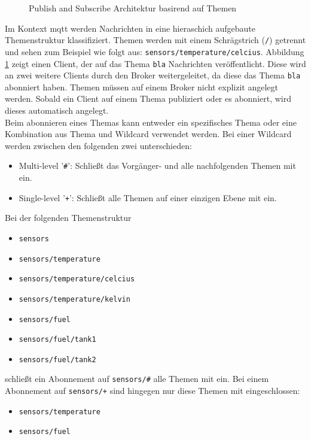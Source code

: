 \begin{figure}
    \centering
    \caption{Publish and Subscribe Architektur basirend auf Themen}
    \label{fig:publish-subscribe}
\end{figure}
Im Kontext \ac{mqtt} werden Nachrichten in eine hieraschich aufgebaute Themenstruktur klassifiziert. Themen werden mit einem Schrägstrich (\verb|/|) getrennt und sehen zum Beispiel wie folgt aus: \verb|sensors/temperature/celcius|. Abbildung \ref{fig:publish-subscribe} zeigt einen Client, der auf das Thema \verb|bla| Nachrichten veröffentlicht. Diese wird an zwei weitere Clients durch den Broker weitergeleitet, da diese das Thema \verb|bla| abonniert haben. Themen müssen auf einem Broker nicht explizit angelegt werden. Sobald ein Client auf einem Thema publiziert oder es abonniert, wird dieses automatisch angelegt.\cite{WhatMQTTDefinition}\\
Beim abonnieren eines Themas kann entweder ein spezifisches Thema oder eine Kombination aus Thema und Wildcard verwendet werden. Bei einer Wildcard werden zwischen den folgenden zwei unterschieden:\cite{mqtt5Specification}
\begin{itemize}
    \item Multi-level '\verb|#|': Schlie{\ss}t das Vorgänger- und alle nachfolgenden Themen mit ein.
    \item Single-level '\verb|+|': Schlie{\ss}t alle Themen auf einer einzigen Ebene mit ein.
\end{itemize}
Bei der folgenden Themenstruktur
\begin{itemize}
    \item \verb|sensors|
    \item \verb|sensors/temperature|
    \item \verb|sensors/temperature/celcius|
    \item \verb|sensors/temperature/kelvin|
    \item \verb|sensors/fuel|
    \item \verb|sensors/fuel/tank1|
    \item \verb|sensors/fuel/tank2|
\end{itemize}
schlie{\ss}t ein Abonnement auf \verb|sensors/#| alle Themen mit ein. Bei einem Abonnement auf \verb|sensors/+| sind hingegen nur diese Themen mit eingeschlossen:
\begin{itemize}
    \item \verb|sensors/temperature|
    \item \verb|sensors/fuel|
\end{itemize}

